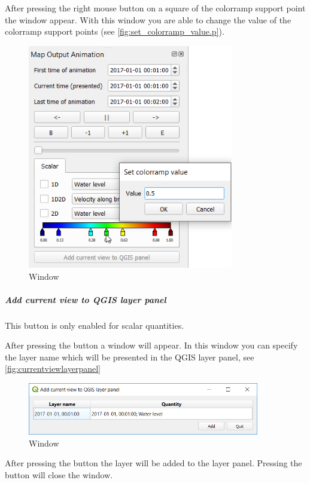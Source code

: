 \documentclass{deltares_memo}
\begin{document}
After pressing the right mouse button on a square of the colorramp support point the window  appear. 
With this window you are able to change the value of the colorramp support points (see \autoref{fig:set_colorramp_value.p}).
\begin{figure}[H]
	\centering    
	\includegraphics[width=0.80\textwidth]{pictures/set_colorramp_value.png}
	\caption{Window \label{fig:currentviewlayerpanel}}
\end{figure}
\subparagraph*{Add current view to QGIS layer panel}
\Note This button is only enabled for scalar quantities.

After pressing the button  a window  will appear.
In this window you can specify the layer name which will be presented in the QGIS layer panel, see \autoref{fig:currentviewlayerpanel}
\begin{figure}[H]
	\centering    
	\includegraphics[width=0.90\textwidth]{pictures/current_view_add.png}
	\caption{Window \label{fig:currentviewlayerpanel}}
\end{figure}
After pressing the button  the layer will be added to the layer panel.
Pressing the  button will close the window.
\end{document}
